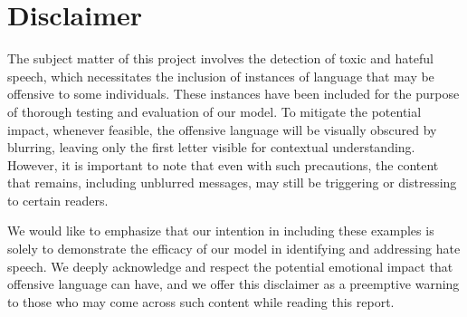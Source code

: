 \section{Disclaimer}

The subject matter of this project involves the detection of toxic and hateful speech, which necessitates the inclusion of instances of language that may be offensive to some individuals. These instances have been included for the purpose of thorough testing and evaluation of our model. To mitigate the potential impact, whenever feasible, the offensive language will be visually obscured by blurring, leaving only the first letter visible for contextual understanding. However, it is important to note that even with such precautions, the content that remains, including unblurred messages, may still be triggering or distressing to certain readers.

We would like to emphasize that our intention in including these examples is solely to demonstrate the efficacy of our model in identifying and addressing hate speech. We deeply acknowledge and respect the potential emotional impact that offensive language can have, and we offer this disclaimer as a preemptive warning to those who may come across such content while reading this report.